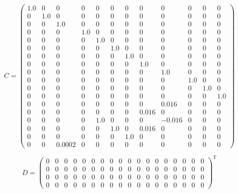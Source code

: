 \documentclass[lettersize,journal]{IEEEtran}
\begin{document}
{\vfill\null
\begin{equation}
C = \left(\begin{array}{cccccccccccc} 1.0 & 0 & 0 & 0 & 0 & 0 & 0 & 0 & 0 & 0 & 0 & 0\\ 0 & 1.0 & 0 & 0 & 0 & 0 & 0 & 0 & 0 & 0 & 0 & 0\\ 0 & 0 & 1.0 & 0 & 0 & 0 & 0 & 0 & 0 & 0 & 0 & 0\\ 0 & 0 & 0 & 1.0 & 0 & 0 & 0 & 0 & 0 & 0 & 0 & 0\\ 0 & 0 & 0 & 0 & 1.0 & 0 & 0 & 0 & 0 & 0 & 0 & 0\\ 0 & 0 & 0 & 0 & 0 & 1.0 & 0 & 0 & 0 & 0 & 0 & 0\\ 0 & 0 & 0 & 0 & 0 & 0 & 1.0 & 0 & 0 & 0 & 0 & 0\\ 0 & 0 & 0 & 0 & 0 & 0 & 0 & 1.0 & 0 & 0 & 0 & 0\\ 0 & 0 & 0 & 0 & 0 & 0 & 0 & 0 & 1.0 & 0 & 0 & 0\\ 0 & 0 & 0 & 0 & 0 & 0 & 0 & 0 & 0 & 1.0 & 0 & 0\\ 0 & 0 & 0 & 0 & 0 & 0 & 0 & 0 & 0 & 0 & 1.0 & 0\\ 0 & 0 & 0 & 0 & 0 & 0 & 0 & 0 & 0 & 0 & 0 & 1.0\\ 0 & 0 & 0 & 0 & 0 & 0 & 0 & 0 & 0.016 & 0 & 0 & 0\\ 0 & 0 & 0 & 0 & 0 & 0 & 0 & 0.016 & 0 & 0 & 0 & 0\\ 0 & 0 & 0 & 0 & 1.0 & 0 & 0 & 0 & -0.016 & 0 & 0 & 0\\ 0 & 0 & 0 & 0 & 0 & 1.0 & 0 & 0.016 & 0 & 0 & 0 & 0\\ 0 & 0 & 0 & 0 & 0 & 0 & 1.0 & 0 & 0 & 0 & 0 & 0\\ 0 & 0 & 0.0002 & 0 & 0 & 0 & 0 & 0 & 0 & 0 & 0 & 0 \end{array}\right)
\end{equation}

\vfill\null
\begin{equation}
D = \left(\begin{array}{cccccccccccccccccc} 0 & 0 & 0 & 0 & 0 & 0 & 0 & 0 & 0 & 0 & 0 & 0 & 0 & 0 & 0 & 0 & 0 & 0\\ 0 & 0 & 0 & 0 & 0 & 0 & 0 & 0 & 0 & 0 & 0 & 0 & 0 & 0 & 0 & 0 & 0 & 0\\ 0 & 0 & 0 & 0 & 0 & 0 & 0 & 0 & 0 & 0 & 0 & 0 & 0 & 0 & 0 & 0 & 0 & 0\\ 0 & 0 & 0 & 0 & 0 & 0 & 0 & 0 & 0 & 0 & 0 & 0 & 0 & 0 & 0 & 0 & 0 & 0 \end{array}\right)^{\mathrm{T}}
\end{equation}

}
\end{document}
